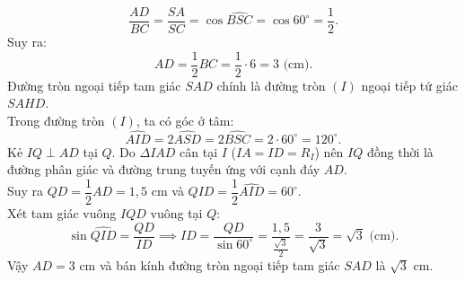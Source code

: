 \begin{bt}
{\begin{enumerate}[a)]
		$$\frac{AD}{BC} = \frac{SA}{SC} = \cos \widehat{BSC} = \cos 60^\circ = \frac{1}{2}.$$
		Suy ra:
		$$AD = \frac{1}{2}BC = \frac{1}{2} \cdot 6 = 3\text{ (cm)}.$$
		Đường tròn ngoại tiếp tam giác $SAD$ chính là đường tròn $(I)$ ngoại tiếp tứ giác $SAHD$.\\
		Trong đường tròn $(I)$, ta có góc ở tâm:
		$$\widehat{AID} = 2\widehat{ASD} = 2\widehat{BSC} = 2 \cdot 60^\circ = 120^\circ.$$
		Kẻ $IQ \perp AD$ tại $Q$. Do $\Delta IAD$ cân tại $I$ ($IA = ID = R_I$) nên $IQ$ đồng thời là đường phân giác và đường trung tuyến ứng với cạnh đáy $AD$.\\
		Suy ra $QD = \dfrac{1}{2}AD = 1{,}5\text{ cm}$ và $\widehat{QID} = \dfrac{1}{2}\widehat{AID} = 60^\circ$.\\
		Xét tam giác vuông $IQD$ vuông tại $Q$:
		$$\sin \widehat{QID} = \frac{QD}{ID} \implies ID = \frac{QD}{\sin 60^\circ} = \frac{1{,}5}{\frac{\sqrt{3}}{2}} = \frac{3}{\sqrt{3}} = \sqrt{3}\text{ (cm)}.$$
		Vậy $AD = 3\text{ cm}$ và bán kính đường tròn ngoại tiếp tam giác $SAD$ là $\sqrt{3}\text{ cm}$.
	\end{enumerate}
}
\end{bt}


